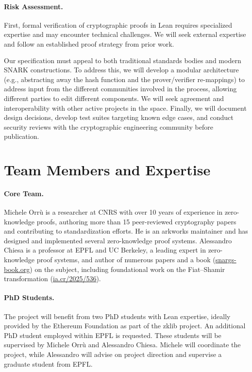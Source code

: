 \documentclass{article}
\begin{document}
\paragraph{Risk Assessment.}
First, formal verification of cryptographic proofs in Lean requires specialized expertise and may encounter technical challenges. We will seek external expertise and follow an established proof strategy from prior work.

Our specification must appeal to both traditional standards bodies and modern SNARK constructions. To address this, we will develop a modular architecture (e.g., abstracting away the hash function and the prover/verifier re-mappings) to address input from the different communities involved in the process, allowing different parties to edit different components. We will seek agreement and interoperability with other active projects in the space.
Finally, we will document design decisions, develop test suites targeting known edge cases, and conduct security reviews with the cryptographic engineering community before publication.

\section{Team Members and Expertise}

\paragraph{Core Team.}
Michele Orrù is a researcher at CNRS with over 10 years of experience in zero-knowledge proofs, authoring more than 15 peer-reviewed cryptography papers and contributing to standardization efforts. He is an arkworks maintainer and has designed and implemented several zero-knowledge proof systems.
Alessandro Chiesa is a professor at EPFL and UC Berkeley, a leading expert in zero-knowledge proof systems, and author of numerous papers and a book (\href{https://snargs-book.org/}{snargs-book.org}) on the subject, including foundational work on the Fiat--Shamir transformation (\href{https://eprint.iacr.org/2025/536.pdf}{ia.cr/2025/536}).

\paragraph{PhD Students.}
The project will benefit from two PhD students with Lean expertise, ideally provided by the Ethereum Foundation as part of the zklib project. An additional PhD student employed within EPFL is requested. These students will be supervised by Michele Orrù and Alessandro Chiesa. Michele will coordinate the project, while Alessandro will advise on project direction and supervise a graduate student from EPFL.
\end{document}
